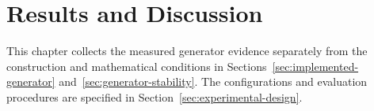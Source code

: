 \section{Results and Discussion}
\label{sec:results-discussion}

This chapter collects the measured generator evidence separately from the
construction and mathematical conditions in
Sections~\ref{sec:implemented-generator} and~\ref{sec:generator-stability}.
The configurations and evaluation procedures are specified in
Section~\ref{sec:experimental-design}.






%
%
%
%
%
